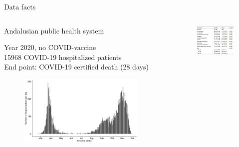 \documentclass[compress,ignorenonframetext,aspectratio=1610]{beamer}
\begin{document}
\begin{frame}{Data facts}

	\begin{columns}
		\begin{column}{0.55\textwidth}
			Andalusian public health system

			Year 2020, no COVID-vaccine \\

			15968 COVID-19 hospitalized patients \\

			End point: COVID-19 certified death (28 days) 

			\begin{figure}
				\includegraphics[width=0.94\textwidth]{figs/results/hospitalizations_timeline.pdf}
			\end{figure}

		\end{column}

		\begin{column}{0.45\textwidth}
		\begin{figure}
			\includegraphics[width=0.99\textwidth]{figs/results/covariates.png}
		\end{figure}

		\end{column}


	\end{columns}

	
\end{frame}
\end{document}
